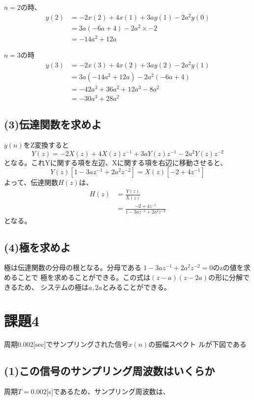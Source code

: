 \documentclass[a4paper,11pt]{ltjsarticle}
\begin{document}
$n = 2$の時、
\begin{align*}
	y(2) &= -2x(2) + 4x(1) + 3ay(1) - 2a^{2}y(0) \\
	&= 3a(-6a + 4) - 2a^{2} \times -2 \\
	&= -14a^{2} + 12a
\end{align*}

$n = 3$の時
\begin{align*}
	y(3) &= -2x(3) + 4x(2) + 3ay(2) - 2a^{2}y(1) \\
	&= 3a(-14a^{2} + 12a) - 2a^{2}(-6a + 4) \\
	&= -42a^{3} + 36a^{2} + 12a^{3} - 8a^{2} \\
	&= -30a^{3} + 28a^{2}
\end{align*}

\subsection*{(3)伝達関数を求めよ}
$y(n)$をZ変換すると
\begin{equation*}
	Y(z)=-2X(z) + 4X(z)z^{-1} + 3aY(z)z^{-1} -2a^{2}Y(z)z^{-2}
\end{equation*}
となる。これYに関する項を左辺、Xに関する項を右辺に移動させると、
\begin{equation*}
	Y(z)[1 - 3az^{-1} + 2a^{2}z^{-2}] = 
	X(z)[-2 + 4z^{-1}]
\end{equation*}
よって、伝達関数$H(z)$は、
\begin{align*}
	H(z) &= \frac{Y(z)}{X(z)} \\
	&= \frac{-2 + 4z^{-1}}{1 - 3az^{-1} + 2a^{2}z^{-2}}
\end{align*}
となる。
\subsection*{(4)極を求めよ}
極は伝達関数の分母の根となる。分母である
${1 - 3az^{-1} + 2a^{2}z^{-2}} = 0$のzの値を求めることで
極を求めることができる。この式は$(z-a)(z-2a)$の形に分解できるため、
システムの極は$a,2a$とみることができる。

\section*{課題4}
周期0.002[sec]でサンプリングされた信号$x(n)$の振幅スペクト
ルが下図である

\subsection*{(1)この信号のサンプリング周波数はいくらか}
周期$T=0.002$[s]であるため、サンプリング周波数は、
\end{document}
